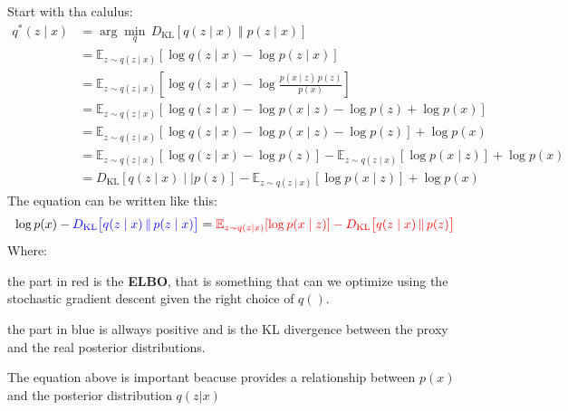 Start with tha calulus:
\begin{align}
    q^*(z \mid x) 
    &= \arg\min_q \, D_{\mathrm{KL}}\!\left[q(z \mid x) \;\Vert\; p(z \mid x)\right] \\
    &= \mathbb{E}_{z \sim q(z \mid x)} \left[ \log q(z \mid x) - \log p(z \mid x) \right] \\
    &= \mathbb{E}_{z \sim q(z \mid x)} \left[ \log q(z \mid x) - \log \frac{p(x \mid z)\, p(z)}{p(x)} \right] \\
    &= \mathbb{E}_{z \sim q(z \mid x)} \left[ \log q(z \mid x) - \log p(x \mid z) - \log p(z) + \log p(x)\right] \\
    &= \mathbb{E}_{z \sim q(z \mid x)} \left[ \log q(z \mid x) - \log p(x \mid z) - \log p(z)\right] + \log p(x) \\
    &= \mathbb{E}_{z \sim q(z \mid x)} \left[ \log q(z \mid x) - \log p(z)\right] - \mathbb{E}_{z \sim q(z \mid x)} \left[\log p(x \mid z)\right] + \log p(x) \\
    &= D_{\mathrm{KL}} \left[q(z \mid x) \mid \mid p(z)\right] - \mathbb{E}_{z \sim q(z \mid x)} \left[\log p(x \mid z)\right] + \log p(x)
\end{align}
The equation can be written like this:
\[
\log p(x) - \color{blue} D_{\mathrm{KL}} \big[q(z \mid x) \, \Vert \, p(z \mid x)\big]
\color{black}=
\color{red}{\mathbb{E}_{z \sim q(z \mid x)}[\log p(x \mid z)] - D_{\mathrm{KL}} \big[q(z \mid x) \, \Vert \, p(z)\big]}
\]
Where:
\begin{compactitemize}
    \item the part in red is the \textbf{ELBO}, that is something that can we optimize using the  stochastic gradient descent given the right choice of $q()$.
    \item the part in blue is allways positive and is the KL divergence between the proxy and the real posterior distributions.
\end{compactitemize}

\begin{infobox}[Note]
    The equation above is important beacuse provides a relationship between $p(x)$ and the posterior distribution $q(z|x)$
\end{infobox}

